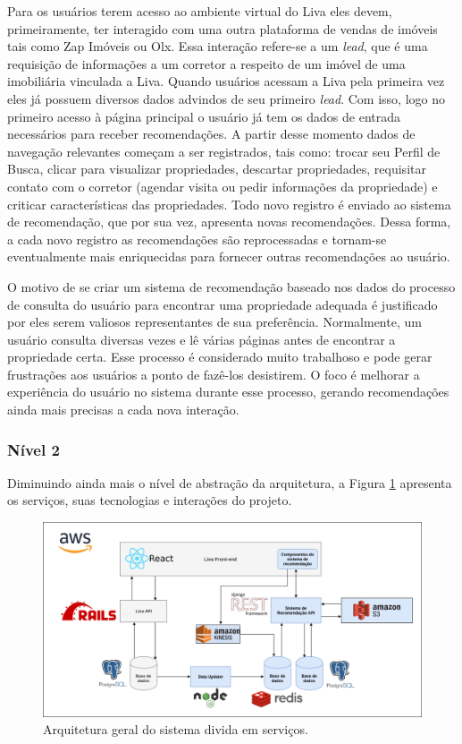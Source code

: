 Para os usuários terem acesso ao ambiente virtual do Liva eles devem, primeiramente, ter interagido com uma outra plataforma de vendas de imóveis tais como Zap Imóveis ou Olx. Essa interação refere-se a um \textit{lead}, que é uma requisição de informações  a um corretor a respeito de um imóvel de uma imobiliária vinculada a Liva. Quando usuários acessam a Liva pela primeira vez eles já possuem diversos dados advindos de seu primeiro \textit{lead}. Com isso, logo no primeiro acesso à página principal o usuário já tem os dados de entrada necessários para receber recomendações. A partir desse momento dados de navegação relevantes começam a ser registrados, tais como: trocar seu Perfil de Busca, clicar para visualizar propriedades, descartar propriedades, requisitar contato com o corretor (agendar visita ou pedir informações da propriedade) e criticar características das propriedades. Todo novo registro é enviado ao sistema de recomendação, que por sua vez, apresenta novas recomendações. Dessa forma, a cada novo registro as recomendações são reprocessadas e tornam-se eventualmente mais enriquecidas para fornecer outras recomendações ao usuário.

O motivo de se criar um sistema de recomendação baseado nos dados do processo de consulta do usuário para encontrar uma propriedade adequada é justificado por eles serem valiosos representantes de sua preferência. Normalmente, um usuário consulta diversas vezes e lê várias páginas antes de encontrar a propriedade certa. Esse processo é considerado muito trabalhoso e pode gerar frustrações aos usuários a ponto de fazê-los desistirem. O foco é melhorar a experiência do usuário no sistema durante esse processo, gerando recomendações ainda mais precisas a cada nova interação.

\subsubsection{Nível 2}
\label{nivel2}
Diminuindo ainda mais o nível de abstração da arquitetura, a Figura \ref{fig:sr_nivel2} apresenta os serviços, suas tecnologias e interações do projeto.

\begin{figure}[H]
    \centering
    \includegraphics[scale=0.4]{figuras/proposta/sr_nivel2.png}
    \caption[Arquitetura geral do sistema divida em serviços]{Arquitetura geral do sistema divida em serviços.}
    \label{fig:sr_nivel2}
\end{figure}

